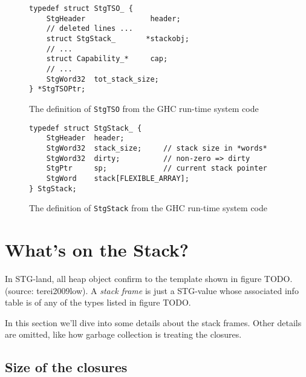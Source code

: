 \begin{figure}
\begin{mdframed}
  \begin{verbatim}
typedef struct StgTSO_ {
    StgHeader               header;
    // deleted lines ...
    struct StgStack_       *stackobj;
    // ...
    struct Capability_*     cap;
    // ...
    StgWord32  tot_stack_size;
} *StgTSOPtr;
  \end{verbatim}
  \caption{The definition of \texttt{StgTSO} from the GHC run-time system
code}
  \label{fig:tso_definition}
\end{mdframed}
\end{figure}

\begin{figure}
\begin{mdframed}
  \begin{verbatim}
typedef struct StgStack_ {
    StgHeader  header;
    StgWord32  stack_size;     // stack size in *words*
    StgWord32  dirty;          // non-zero => dirty
    StgPtr     sp;             // current stack pointer
    StgWord    stack[FLEXIBLE_ARRAY];
} StgStack;
  \end{verbatim}
  \caption{The definition of \texttt{StgStack} from the GHC run-time system
code}
  \label{fig:stack_definition}
\end{mdframed}
\end{figure}

\section{What's on the Stack?}

In STG-land, all heap object confirm to the template shown in figure TODO.
(source: terei2009low). A \emph{stack frame} is just a STG-value whose
associated info table is of any of the types listed in figure TODO. %

In this section we'll dive into
some details about the stack frames. Other details
are omitted, like how garbage collection is treating the closures.

\subsection{Size of the closures}



